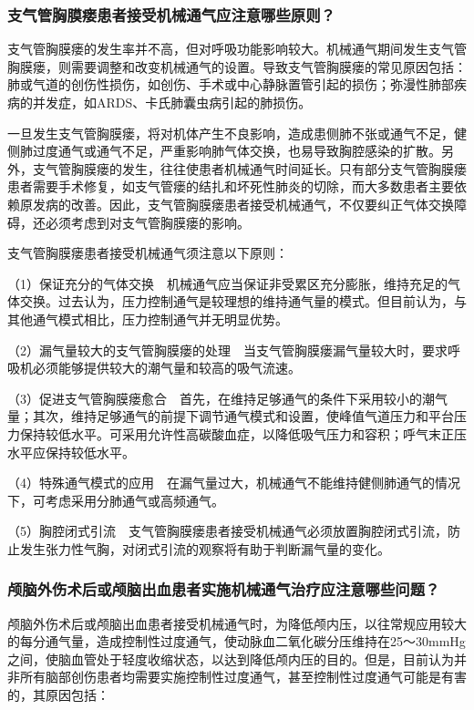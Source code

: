 \subsubsection{支气管胸膜瘘患者接受机械通气应注意哪些原则？}

支气管胸膜瘘的发生率并不高，但对呼吸功能影响较大。机械通气期间发生支气管胸膜瘘，则需要调整和改变机械通气的设置。导致支气管胸膜瘘的常见原因包括：肺或气道的创伤性损伤，如创伤、手术或中心静脉置管引起的损伤；弥漫性肺部疾病的并发症，如ARDS、卡氏肺囊虫病引起的肺损伤。

一旦发生支气管胸膜瘘，将对机体产生不良影响，造成患侧肺不张或通气不足，健侧肺过度通气或通气不足，严重影响肺气体交换，也易导致胸腔感染的扩散。另外，支气管胸膜瘘的发生，往往使患者机械通气时间延长。只有部分支气管胸膜瘘患者需要手术修复，如支气管瘘的结扎和坏死性肺炎的切除，而大多数患者主要依赖原发病的改善。因此，支气管胸膜瘘患者接受机械通气，不仅要纠正气体交换障碍，还必须考虑到对支气管胸膜瘘的影响。

支气管胸膜瘘患者接受机械通气须注意以下原则：

（1）保证充分的气体交换　机械通气应当保证非受累区充分膨胀，维持充足的气体交换。过去认为，压力控制通气是较理想的维持通气量的模式。但目前认为，与其他通气模式相比，压力控制通气并无明显优势。

（2）漏气量较大的支气管胸膜瘘的处理　当支气管胸膜瘘漏气量较大时，要求呼吸机必须能够提供较大的潮气量和较高的吸气流速。

（3）促进支气管胸膜瘘愈合　首先，在维持足够通气的条件下采用较小的潮气量；其次，维持足够通气的前提下调节通气模式和设置，使峰值气道压力和平台压力保持较低水平。可采用允许性高碳酸血症，以降低吸气压力和容积；呼气末正压水平应保持较低水平。

（4）特殊通气模式的应用　在漏气量过大，机械通气不能维持健侧肺通气的情况下，可考虑采用分肺通气或高频通气。

（5）胸腔闭式引流　支气管胸膜瘘患者接受机械通气必须放置胸腔闭式引流，防止发生张力性气胸，对闭式引流的观察将有助于判断漏气量的变化。

\subsubsection{颅脑外伤术后或颅脑出血患者实施机械通气治疗应注意哪些问题？}

颅脑外伤术后或颅脑出血患者接受机械通气时，为降低颅内压，以往常规应用较大的每分通气量，造成控制性过度通气，使动脉血二氧化碳分压维持在25～30mmHg之间，使脑血管处于轻度收缩状态，以达到降低颅内压的目的。但是，目前认为并非所有脑部创伤患者均需要实施控制性过度通气，甚至控制性过度通气可能是有害的，其原因包括：

